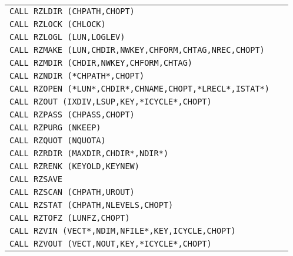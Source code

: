 \begin{Tabhere}
\begin{center}
\begin{tabular}{|>{\tt}l@{\quad}r|}
CALL RZLDIR (CHPATH,CHOPT)                               & \pageref{RZLDIR} \\
CALL RZLOCK (CHLOCK)                                     & \pageref{RZLOCK} \\
CALL RZLOGL (LUN,LOGLEV)                                 & \pageref{RZLOGL} \\
CALL RZMAKE (LUN,CHDIR,NWKEY,CHFORM,CHTAG,NREC,CHOPT)    & \pageref{RZMAKE} \\
CALL RZMDIR (CHDIR,NWKEY,CHFORM,CHTAG)                   & \pageref{RZMDIR} \\
CALL RZNDIR (*CHPATH*,CHOPT)                             & \pageref{RZNDIR} \\
CALL RZOPEN (*LUN*,CHDIR*,CHNAME,CHOPT,*LRECL*,ISTAT*)   & \pageref{RZOPEN} \\
CALL RZOUT (IXDIV,LSUP,KEY,*ICYCLE*,CHOPT)               & \pageref{RZOUT}  \\
CALL RZPASS (CHPASS,CHOPT)                               & \pageref{RZPASS} \\
CALL RZPURG (NKEEP)                                      & \pageref{RZPURG} \\
CALL RZQUOT (NQUOTA)                                     & \pageref{RZQUOT} \\
CALL RZRDIR (MAXDIR,CHDIR*,NDIR*)                        & \pageref{RZRDIR} \\
CALL RZRENK (KEYOLD,KEYNEW)                              & \pageref{RZRENK} \\
CALL RZSAVE                                              & \pageref{RZSAVE} \\
CALL RZSCAN (CHPATH,UROUT)                               & \pageref{RZSCAN} \\
CALL RZSTAT (CHPATH,NLEVELS,CHOPT)                       & \pageref{RZSTAT} \\
CALL RZTOFZ (LUNFZ,CHOPT)                                & \pageref{RZTOFZ} \\
CALL RZVIN (VECT*,NDIM,NFILE*,KEY,ICYCLE,CHOPT)          & \pageref{RZVIN}  \\
CALL RZVOUT (VECT,NOUT,KEY,*ICYCLE*,CHOPT)               & \pageref{RZVOUT} \\
\hline
\end{tabular}
\end{center}
\end{Tabhere}
